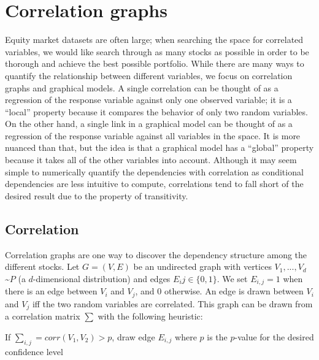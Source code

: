 \section{Correlation graphs}
\label{sec:intro:correlation}

Equity market datasets are often large; when searching the space for correlated variables, we would like search through as many stocks as possible in order to be thorough and achieve the best possible portfolio. While there are many ways to quantify the relationship between different variables, we focus on correlation graphs and graphical models. A single correlation can be thought of as a regression of the response variable against only one observed variable; it is a ``local'' property because it compares the behavior of only two random variables. On the other hand, a single link in a graphical model can be thought of as a regression of the response variable against all variables in the space. It is more nuanced than that, but the idea is that a graphical model has a “global” property because it takes all of the other variables into account. Although it may seem simple to numerically quantify the dependencies with correlation as conditional dependencies are less intuitive to compute, correlations tend to fall short of the desired result due to the property of transitivity.

\subsection{Correlation}

Correlation graphs are one way to discover the dependency structure among the different stocks. Let $G=(V,E)$ be an undirected graph with vertices $V_{1},...,V_{d}$ \textasciitilde $P$ (a $d$-dimensional distribution) and edges $E_ij\in\{0,1\}$. We set $E_{i,j}=1$ when there is an edge between $V_i$ and $V_j$, and 0 otherwise. An edge is drawn between $V_i$ and $V_j$ iff the two random variables are correlated. This graph can be drawn from a correlation matrix $\sum$ with the following heuristic:\\

\begin{algorithm}
	If $\sum_{i,j}=corr(V_1,V_2)>p$, draw edge $E_{i,j}$ where $p$ is the $p$-value for the desired confidence level
\end{algorithm}


